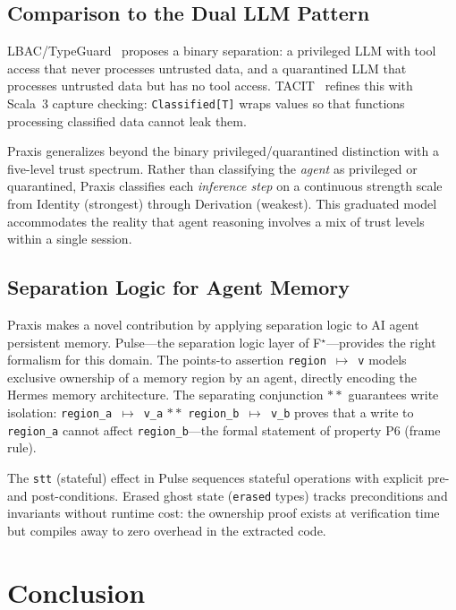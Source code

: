 \documentclass[sigplan,screen,nonacm]{acmart}
\newcommand{\fstar}{F\ensuremath{^\star}}
\newcommand{\pointsto}{\ensuremath{\mapsto}}
\newcommand{\sepconj}{\ensuremath{\mathbin{*\!*}}}
\begin{document}
\subsection{Comparison to the Dual LLM Pattern}

LBAC/TypeGuard~\cite{zhou2026lbac} proposes a binary separation: a
privileged LLM with tool access that never processes untrusted data, and a
quarantined LLM that processes untrusted data but has no tool access.
TACIT~\cite{odersky2026tacit} refines this with Scala~3 capture
checking: \texttt{Classified[T]} wraps values so that functions
processing classified data cannot leak them.

Praxis generalizes beyond the binary privileged/quarantined
distinction with a five-level trust spectrum.
Rather than classifying the \emph{agent} as privileged or quarantined,
Praxis classifies each \emph{inference step} on a continuous strength
scale from Identity (strongest) through Derivation (weakest).
This graduated model accommodates the reality that agent reasoning
involves a mix of trust levels within a single session.

\subsection{Separation Logic for Agent Memory}

Praxis makes a novel contribution by applying separation logic to AI
agent persistent memory. Pulse---the separation logic layer of
\fstar{}---provides the right formalism for this domain. The points-to
assertion \texttt{region}~$\pointsto$~\texttt{v} models exclusive
ownership of a memory region by an agent, directly encoding the Hermes
memory architecture. The separating conjunction $\sepconj$ guarantees
write isolation: \texttt{region\_a}~$\pointsto$~\texttt{v\_a}
$\sepconj$ \texttt{region\_b}~$\pointsto$~\texttt{v\_b} proves that a
write to \texttt{region\_a} cannot affect \texttt{region\_b}---the
formal statement of property P6 (frame rule).

The \texttt{stt} (stateful) effect in Pulse sequences stateful
operations with explicit pre- and post-conditions. Erased ghost state
(\texttt{erased} types) tracks preconditions and invariants without
runtime cost: the ownership proof exists at verification time but
compiles away to zero overhead in the extracted code.


\section{Conclusion}
\label{sec:conclusion}
\end{document}
